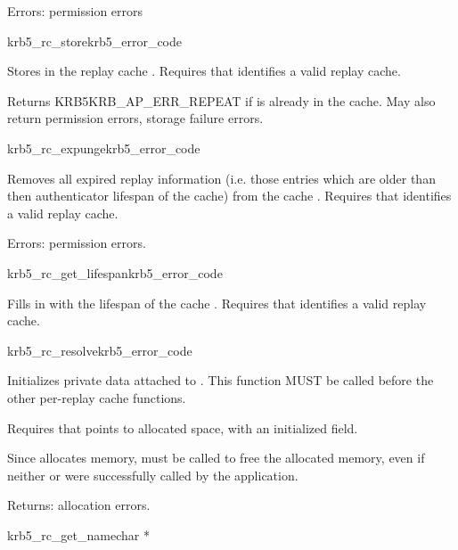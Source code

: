 Errors: permission errors

\begin{funcdecl}{krb5_rc_store}{krb5_error_code}{\funcin}
\end{funcdecl}
Stores  in the replay cache .
Requires that  identifies a valid replay cache.

Returns KRB5KRB_AP_ERR_REPEAT if  is already in the
cache.  May also return permission errors, storage failure errors.

\begin{funcdecl}{krb5_rc_expunge}{krb5_error_code}{\funcin}
\end{funcdecl}
Removes all expired replay information (i.e. those entries which are
older than then authenticator lifespan of the cache) from the cache
.  Requires that  identifies a valid replay
cache.

Errors: permission errors.

\begin{funcdecl}{krb5_rc_get_lifespan}{krb5_error_code}{\funcin}
\funcout
{}
\end{funcdecl}
Fills in  with the lifespan of
the cache .
Requires that  identifies a valid replay cache.

\begin{funcdecl}{krb5_rc_resolve}{krb5_error_code}{\funcinout}
\funcin
{}
\end{funcdecl}

Initializes private data attached to .  This function MUST
be called before the other per-replay cache functions.

Requires that  points to allocated space, with an
initialized  field.

Since  allocates memory,
 must be called to free the allocated memory,
even if neither  or
 were successfully called by the application.

Returns:  allocation errors.


\begin{funcdecl}{krb5_rc_get_name}{char *}{\funcin}
\end{funcdecl}

